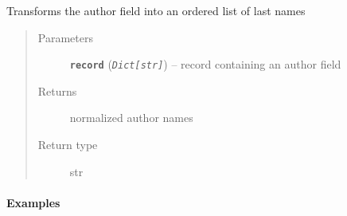 \documentclass[letterpaper,10pt,english]{sphinxmanual}
\begin{document}
\begin{fulllineitems}
\end{fulllineitems}


\begin{fulllineitems}
\label{modules/normalizetex:listb.normalizetex.norm_author}
Transforms the author field into an ordered list of last names
\begin{quote}\begin{description}
\item[{Parameters}] \leavevmode
\textbf{\texttt{record}} (\emph{\texttt{Dict{[}str{]}}}) -- record containing an author field

\item[{Returns}] \leavevmode
normalized author names

\item[{Return type}] \leavevmode
str

\end{description}\end{quote}
\paragraph{Examples}


\end{fulllineitems}
\end{document}
